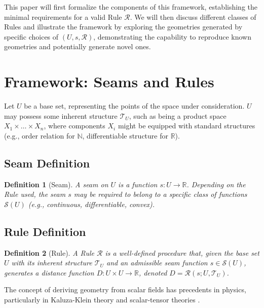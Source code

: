 \documentclass[twoside,twocolumn]{article}
\newtheorem{definition}{Definition}[subsection] %
\begin{document}
This paper will first formalize the components of this framework, establishing the minimal requirements for a valid Rule $\mathcal{R}$. We will then discuss different classes of Rules and illustrate the framework by exploring the geometries generated by specific choices of $(U, s, \mathcal{R})$, demonstrating the capability to reproduce known geometries and potentially generate novel ones.


\section{Framework: Seams and Rules}

Let $U$ be a base set, representing the points of the space under consideration. $U$ may possess some inherent structure $\mathcal{T}_U$, such as being a product space $X_1 \times \dots \times X_n$, where components $X_i$ might be equipped with standard structures (e.g., order relation for $\mathbb{N}$, differentiable structure for $\mathbb{R}$).

\setcounter{subsection}{0} %
\subsection{Seam Definition} %
\begin{definition}[Seam]
A \emph{seam} on $U$ is a function $s: U \to \mathbb{R}$. Depending on the Rule used, the seam $s$ may be required to belong to a specific class of functions $\mathcal{S}(U)$ (e.g., continuous, differentiable, convex).
\end{definition}

\subsection{Rule Definition} %
\begin{definition}[Rule]
A \emph{Rule} $\mathcal{R}$ is a well-defined procedure that, given the base set $U$ with its inherent structure $\mathcal{T}_U$ and an admissible seam function $s \in \mathcal{S}(U)$, generates a distance function $D: U \times U \to \mathbb{R}$, denoted $D = \mathcal{R}(s; U, \mathcal{T}_U)$.
\end{definition}
The concept of deriving geometry from scalar fields has precedents in physics, particularly in Kaluza-Klein theory \cite{Kaluza1921,Klein1926} and scalar-tensor theories \cite{BransDicke1961}.
\end{document}
